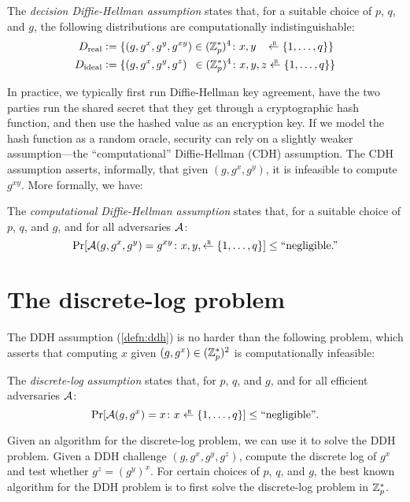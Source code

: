 \begin{definition}\label{defn:ddh}
The \emph{decision Diffie-Hellman assumption} states that,
for a suitable choice of $p$, $q$, and $g$, the following distributions are 
computationally indistinguishable:
  \begin{align*}
    D_\text{real} &\deq \{ (g, g^x, g^y, g^{xy}) \in (\Z^*_p)^4\colon x, y \,\,\,\,\,\getsr \{1, \dots, q\}\}\\
    D_\text{ideal} &\deq \{ (g, g^x, g^y, g^z) \,\,\,\in (\Z^*_p)^4 \colon x, y, z \getsr \{1, \dots, q\}\}
  \end{align*}
\end{definition}

In practice, we typically first run Diffie-Hellman key
agreement, have the two parties run the
shared secret that they get through a cryptographic hash function, 
and then use the hashed value as an encryption key.
If we model the hash function as a random oracle, security can rely
on a slightly weaker assumption---the ``computational'' Diffie-Hellman
(CDH) assumption.
The CDH assumption asserts, informally, that given $(g, g^x, g^y)$, it is
infeasible to compute $g^{xy}$. More formally, we have:

\begin{definition}\label{defn:cdh}
The \emph{computational Diffie-Hellman assumption} states that,
for a suitable choice of $p$, $q$, and $g$, and for all adversaries $\mathcal{A}$:
\[ \Pr[\calA(g, g^x, g^y) = g^{xy} \colon x, y, \getsr\{1, \dots, q\} ] \leq \text{``negligible.''}\]
\end{definition}


\section{The discrete-log problem}
The DDH assumption (\cref{defn:ddh}) is no harder than the following
problem, which asserts that computing $x$ given $(g, g^x) \in (\mathbb{Z}_p^*)^2$
is computationally infeasible:
\begin{definition}
The \emph{discrete-log assumption} states that,
for $p$, $q$, and $g$, and for all efficient 
adversaries $\mathcal{A}$:
  \[ \Pr[\calA(g, g^x) = x \colon x \getsr \{1, \dots, q\} ] \leq \text{``negligible''}.\]
\end{definition}
Given an algorithm for the discrete-log problem, we can use it to solve the DDH problem.
Given a DDH challenge $(g, g^x, g^y, g^{z})$, compute the discrete log of $g^x$ and
test whether $g^z = {(g^y)}^x$.
For certain choices of $p$, $q$, and $g$, the best known algorithm for the DDH problem
is to first solve the discrete-log problem in $\mathbb{Z}^*_p$.

